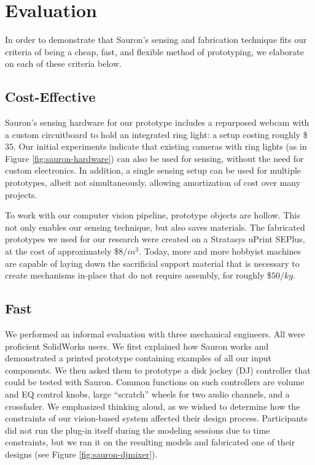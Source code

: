 \section{Evaluation}

In order to demonstrate that Sauron's sensing and fabrication technique fits our criteria of being a cheap, fast, and flexible method of prototyping, we elaborate on each of these criteria below.

    \subsection{Cost-Effective}
    
    Sauron's sensing hardware for our prototype includes a repurposed webcam with a custom circuitboard to hold an integrated ring light: a setup costing roughly \$$35$. Our initial experiments indicate that existing cameras with ring lights (as in Figure \ref{fig:sauron-hardware}) can also be used for sensing, without the need for custom electronics. In addition, a single sensing setup can be used for multiple prototypes, albeit not simultaneously, allowing amortization of cost over many projects.
    
    To work with our computer vision pipeline, prototype objects are hollow. This not only enables our sensing technique, but also saves materials. The fabricated prototypes we used for our research were created on a Stratasys uPrint SEPlus, at the cost of approximately \$$8/in^3$. Today, more and more hobbyist machines are capable of laying down the sacrificial support material that is necessary to create mechanisms in-place that do not require assembly, for roughly \$$50/kg$.
    
    \subsection{Fast}
    
    We performed an informal evaluation with three mechanical engineers. All were proficient SolidWorks users. We first explained how Sauron works and demonstrated a printed prototype containing examples of all our input components. We then asked them to prototype a disk jockey (DJ) controller that could be tested with Sauron. Common functions on such controllers are volume and EQ control knobs, large ``scratch'' wheels for two audio channels, and a crossfader. We emphasized thinking aloud, as we wished to determine how the constraints of our vision-based system affected their design process. Participants did not run the plug-in itself during the modeling sessions due to time constraints, but we ran it on the resulting models and fabricated one of their designs (see Figure \ref{fig:sauron-djmixer}).
    
